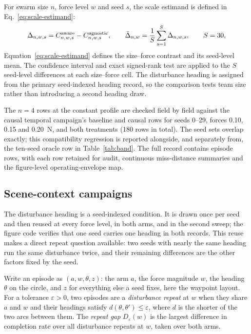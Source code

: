 For swarm size $n$, force level $w$ and seed $s$, the scale estimand is defined in
Eq.~\eqref{eq:scale-estimand}:
\begin{equation}
  \Delta_{n,w,s}=C^{\mathrm{aware}}_{n,w,s}-C^{\mathrm{agnostic}}_{n,w,s},
  \qquad
  \bar\Delta_{n,w}=\frac{1}{S}\sum_{s=1}^{S}\Delta_{n,w,s},
  \qquad S=30{},
  \label{eq:scale-estimand}
\end{equation}
Equation~\eqref{eq:scale-estimand} defines the size--force contrast and its
seed-level mean. The confidence interval and exact signed-rank test are applied to the $S$
seed-level differences at each size--force cell. The disturbance heading is
assigned from the primary seed-indexed heading record, so the comparison tests
team size rather than introducing a second heading draw.

The $n=4$ rows at the constant profile are checked field by field against the
causal temporal campaign's baseline and causal rows for seeds 0--29, forces 0.10,
0.15 and 0.20~N, and both treatments (180 rows in total). The seed sets overlap
exactly; this compatibility regression is reported alongside, and separately from,
the ten-seed oracle row in Table~\ref{tab:band}. The full record contains
\NScaleEpisodes{} episode rows,
with each row retained for audit, continuous miss-distance summaries and the
figure-level operating-envelope map.

\subsection{Scene-context campaigns}

The disturbance heading is a seed-indexed condition. It is drawn once per seed
and then reused at every force level, in both arms, and in the second sweep; the
figure code verifies that one seed carries one heading in both records. This
reuse makes a direct repeat question available: two seeds with nearly the same
heading run the same disturbance twice, and their remaining differences are the
other factors fixed by the seed.

\begin{definition}\label{def:repeat}
Write an episode as $(a, w, \theta, z)$: the arm $a$, the force magnitude $w$,
the heading $\theta$ on the circle, and $z$ for everything else a seed fixes,
here the waypoint layout. For a tolerance $\varepsilon > 0$, two episodes are a
\emph{disturbance repeat} at $w$ when they share $a$ and $w$ and their headings
satisfy $d(\theta,\theta') \le \varepsilon$, where $d$ is the shorter of the two
arcs between them. The \emph{repeat gap} $D_\varepsilon(w)$ is the largest
difference in completion rate over all disturbance repeats at $w$, taken over
both arms.
\end{definition}

